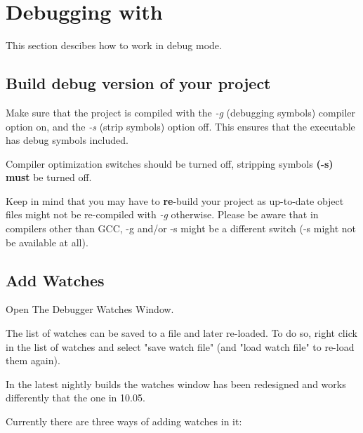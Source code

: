\section{Debugging with \codeblocks}\label{sec:debugwithcb}

This section descibes how to work in debug mode.

\subsection{Build debug version of your project}

Make sure that the project is compiled with the \textit{-g} (debugging symbols) compiler option on, and the \textit{-s} (strip symbols) option off. This ensures that the executable has debug symbols included.

Compiler optimization switches should be turned off, stripping symbols \textbf{(-s) must} be turned off.

Keep in mind that you may have to \textbf{re}-build your project as up-to-date object files might not be re-compiled with \textit{-g} otherwise. Please be aware that in compilers other than GCC, -g and/or -s might be a different switch (-s might not be available at all).


\subsection{Add Watches}


Open The Debugger Watches Window.

The list of watches can be saved to a file and later re-loaded. To do so, right click in the list of watches and select "save watch file" (and "load watch file" to re-load them again). 


In the latest nightly builds the watches window has been redesigned and works differently that the one in 10.05.

Currently there are three ways of adding watches in it:

